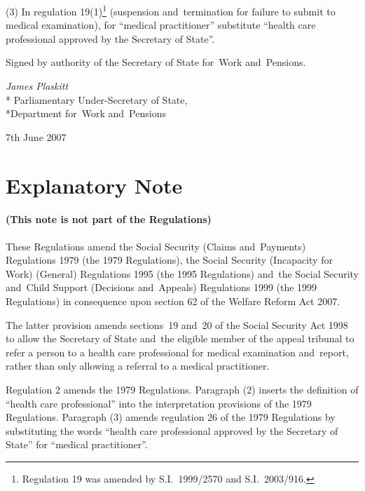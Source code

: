 \documentclass[12pt,a4paper]{article}
\begin{document}
(3) In regulation 19(1)\footnote{Regulation 19 was amended by S.I.~1999/2570 and S.I.~2003/916.} (suspension and~termination for failure to submit to medical examination), for “medical practitioner” substitute “health care professional approved by the Secretary of State”. 

\bigskip

Signed 
by authority of the 
Secretary of State for~Work and~Pensions.

{\raggedleft
\emph{James Plaskitt}\\*
Parliamentary Under-Secretary 
of State,\\*Department 
for~Work and~Pensions

}

7th June 2007

\small

\part{Explanatory Note}

\renewcommand\parthead{— Explanatory Note}

\subsection*{(This note is not part of the Regulations)}

These Regulations amend the Social Security (Claims and~Payments) Regulations 1979 (the 1979 Regulations), the Social Security (Incapacity for Work) (General) Regulations 1995 (the 1995 Regulations) and~the Social Security and~Child Support (Decisions and~Appeals) Regulations 1999 (the 1999 Regulations) in consequence upon section 62 of the Welfare Reform Act 2007.

The latter provision amends sections~19 and~20 of the Social Security Act 1998 to allow the Secretary of State and~the eligible member of the appeal tribunal to refer a person to a health care professional for medical examination and~report, rather than only allowing a referral to a medical practitioner.

Regulation 2 amends the 1979 Regulations. Paragraph (2) inserts the definition of “health care professional” into the interpretation provisions of the 1979 Regulations. Paragraph (3) amends regulation 26 of the 1979 Regulations by substituting the words “health care professional approved by the Secretary of State” for “medical practitioner”.
\end{document}
